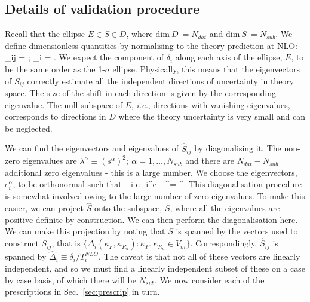 \subsection{Details of validation procedure}
\label{subsec:val_details}
Recall that the ellipse $E \in S \in D$, where $\text{dim}\ D\ = N_{dat}$ and $\text{dim}\ S\ = N_{sub}$.
We define dimensionless quantities by normalising to the theory prediction at NLO:
\beq 
{}_{ij} = ; \qquad \delta_i = .
\eeq
We expect the component of $\delta_i$ along each axis of the ellipse, $E$, to be the same order as the 1-$\sigma$ ellipse. Physically, this means that the eigenvectors of $S_{ij}$ correctly estimate all the independent directions of uncertainty in theory space. The size of the shift in each direction is given by the corresponding eigenvalue. The null subspace of $E$, \textit{i.e.}, directions with vanishing eigenvalues, corresponds to directions in $D$ where the theory uncertainty is very small and can be neglected.

We can find the eigenvectors and eigenvalues of $\widehat{S}_{ij}$ by diagonalising it. The non-zero eigenvalues are $\lambda^\alpha \equiv (s^\alpha)^2;\ \alpha =1,\dots,N_{sub}$ and there are $N_{dat} - N_{sub}$ additional zero eigenvalues - this is a large number. We choose the eigenvectors, $e_i^\alpha$, to be orthonormal such that
\be
\sum_i e_i^\alpha e_i^\beta = \delta^{\alpha \beta}.
\ee
This diagonalisation procedure is somewhat involved owing to the large number of zero eigenvalues. To make this easier, we can project $\widehat{S}$ onto the subspace, $S$, where all the eigenvalues are positive definite by construction. We can then perform the diagonalisation here. We can make this projection by noting that $S$ is spanned by the vectors used to construct $S_{ij}$, that is $\{\Delta_i(\kappa_F, \kappa_{R_a}): \kappa_F, \kappa_{R_a} \in V_m\}$. Correspondingly, $\hat{S}_{ij}$ is spanned by $\hat{\Delta}_i \equiv \delta_i/T_i^{NLO}$. The caveat is that not all of these vectors are linearly independent, and so we must find a linearly independent subset of these on a case by case basis, of which there will be $N_{sub}$. We now consider each of the prescriptions in Sec.~\ref{sec:prescrip} in turn.
